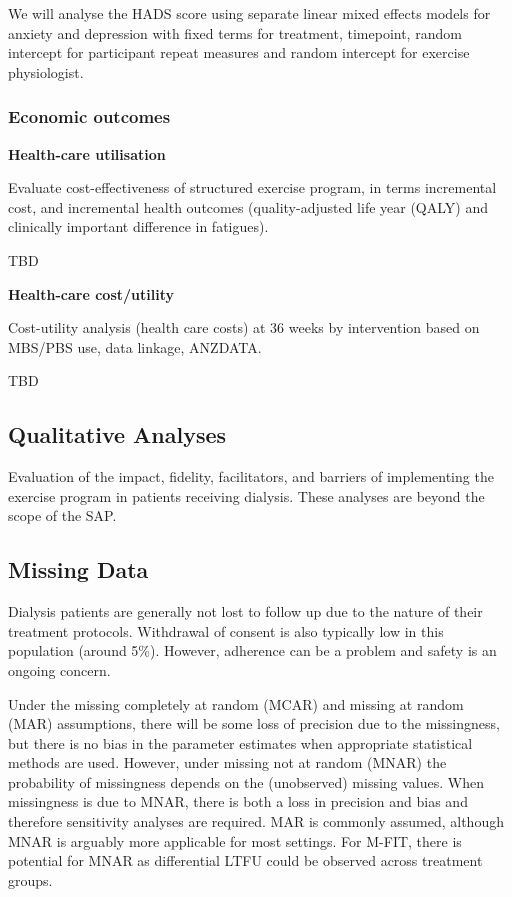 \documentclass[
]{article}
\begin{document}
We will analyse the HADS score using separate linear mixed effects models for anxiety and depression with fixed terms for treatment, timepoint, random intercept for participant repeat measures and random intercept for exercise physiologist.




\hypertarget{economic-outcomes}{%
  \subsubsection{Economic outcomes}\label{economic-outcomes}}

\textbf{Health-care utilisation}

Evaluate cost-effectiveness of structured exercise program, in terms incremental cost, and incremental health outcomes (quality-adjusted life year (QALY) and clinically important difference in fatigues).

TBD

\textbf{Health-care cost/utility}

Cost-utility analysis (health care costs) at 36 weeks by intervention based on MBS/PBS use, data linkage, ANZDATA.

TBD



\hypertarget{qualitative-analyses}{%
  \subsection{Qualitative Analyses}\label{qualitative-analyses}}

Evaluation of the impact, fidelity, facilitators, and barriers of implementing the exercise program in patients receiving dialysis.
These analyses are beyond the scope of the SAP.

\hypertarget{missing-data}{%
  \subsection{Missing Data}\label{missing-data}}

Dialysis patients are generally not lost to follow up due to the nature of their treatment protocols.
Withdrawal of consent is also typically low in this population (around 5\%).
However, adherence can be a problem and safety is an ongoing concern.

Under the missing completely at random (MCAR) and missing at random (MAR) assumptions, there will be some loss of precision due to the missingness, but there is no bias in the parameter estimates when appropriate statistical methods are used.
However, under missing not at random (MNAR) the probability of missingness depends on the (unobserved) missing values.
When missingness is due to MNAR, there is both a loss in precision and bias and therefore sensitivity analyses are required.
MAR is commonly assumed, although MNAR is arguably more applicable for most settings.
For M-FIT, there is potential for MNAR as differential LTFU could be observed across treatment groups.
\end{document}
